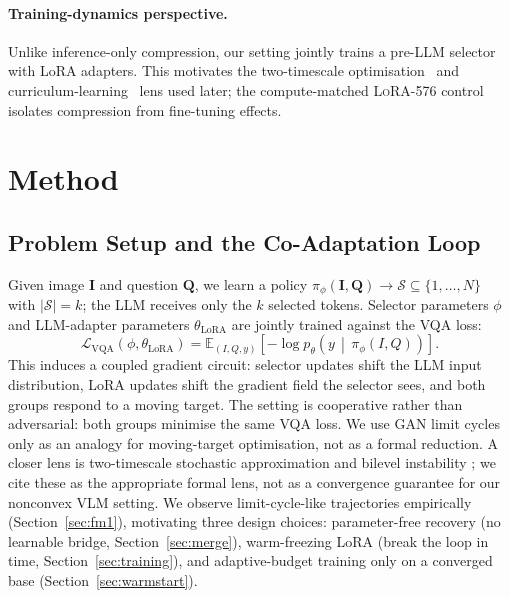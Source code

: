 \documentclass[runningheads]{llncs}
\newcommand{\Lvqa}{\mathcal{L}_{\mathrm{VQA}}}
\begin{document}
\paragraph{Training-dynamics perspective.}
Unlike inference-only compression, our setting jointly trains a pre-LLM
selector with LoRA adapters. This motivates the two-timescale
optimisation~\cite{borkar1997stochastic,konda2004convergence} and
curriculum-learning~\cite{bengio2009curriculum} lens used later; the
compute-matched \textsc{LoRA-576} control isolates compression from
fine-tuning effects.

\section{Method}
\label{sec:method}

\subsection{Problem Setup and the Co-Adaptation Loop}
\label{sec:co-adaptation}

Given image $\mathbf{I}$ and question $\mathbf{Q}$, we learn a policy
$\pi_\phi(\mathbf{I},\mathbf{Q})\!\to\!\mathcal{S}\!\subseteq\!\{1,\ldots,N\}$
with $|\mathcal{S}|{=}k$; the LLM receives only the $k$ selected
tokens. Selector parameters $\phi$ and LLM-adapter parameters
$\theta_\text{LoRA}$ are jointly trained against the VQA loss:
\begin{equation}
\Lvqa(\phi,\theta_\text{LoRA})
= \mathbb{E}_{(I,Q,y)}
\left[-\log p_\theta\!\left(y\,\middle|\,\pi_\phi(I,Q)\right)\right].
\label{eq:vqa-loss}
\end{equation}
This induces a coupled gradient circuit: selector updates shift the
LLM input distribution, LoRA updates shift the gradient field the
selector sees, and both groups respond to a moving target. The setting
is cooperative rather than adversarial: both groups minimise the
same VQA loss. We use GAN limit cycles only as an analogy for
moving-target optimisation, not as a formal reduction. A closer lens is
two-timescale stochastic approximation and bilevel instability
\cite{borkar1997stochastic,konda2004convergence}; we cite these as the
appropriate formal lens, not as a convergence guarantee for our
nonconvex VLM setting. We observe limit-cycle-like trajectories
empirically (Section~\ref{sec:fm1}), motivating three design choices:
parameter-free recovery (no learnable bridge, Section~\ref{sec:merge}),
warm-freezing LoRA (break the loop in time,
Section~\ref{sec:training}), and adaptive-budget training only on a
converged base (Section~\ref{sec:warmstart}).
\end{document}
